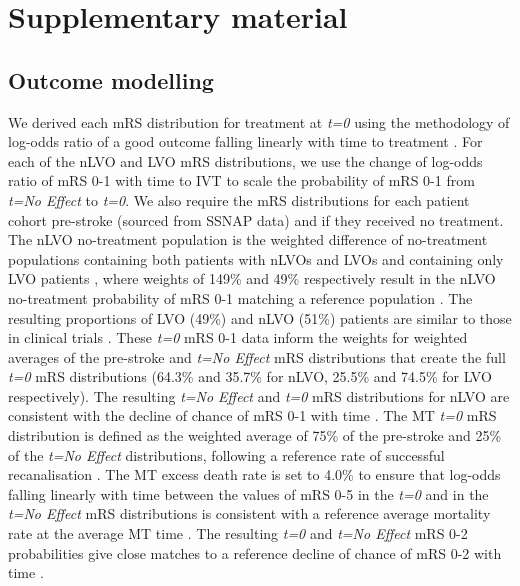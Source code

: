 \section{Supplementary material}

\subsection{Outcome modelling}

We derived each mRS distribution for treatment at \emph{t=0} using the methodology of log-odds ratio of a good outcome falling linearly with time to treatment \cite{emberson_effect_2014, fransen_time_2016}. For each of the nLVO and LVO mRS distributions, we use the change of log-odds ratio of mRS 0-1 with time to IVT \cite{emberson_effect_2014} to scale the probability of mRS 0-1 from \emph{t=No Effect} to \emph{t=0}. We also require the mRS distributions for each patient cohort pre-stroke (sourced from SSNAP data) and if they received no treatment. The nLVO no-treatment population is the weighted difference of no-treatment populations containing both patients with nLVOs and LVOs \cite{lees_time_2010} and containing only LVO patients \cite{goyal_endovascular_2016}, where weights of 149\% and 49\% respectively result in the nLVO no-treatment probability of mRS 0-1 matching a reference population \cite{emberson_effect_2014}. The resulting proportions of LVO (49\%) and nLVO (51\%) patients are similar to those in clinical trials \cite{ist-3_collaborative_group_benefits_2012, emberson_effect_2014}. 
These \emph{t=0} mRS 0-1 data inform the weights for weighted averages of the pre-stroke and \emph{t=No Effect} mRS distributions that create the full \emph{t=0} mRS distributions (64.3\% and 35.7\% for nLVO, 25.5\% and 74.5\% for LVO respectively). The resulting \emph{t=No Effect} and \emph{t=0} mRS distributions for nLVO are consistent with the decline of chance of mRS 0-1 with time \cite{holodinsky_modeling_2018}. The MT \emph{t=0} mRS distribution is defined as the weighted average of 75\% of the pre-stroke and 25\% of the \emph{t=No Effect} distributions, following a reference rate of successful recanalisation \cite{hui_efficacy_2020}. The MT excess death rate is set to 4.0\% to ensure that log-odds falling linearly with time between the values of mRS 0-5 in the \emph{t=0} and in the \emph{t=No Effect} mRS distributions is consistent with a reference average mortality rate at the average MT time \cite{goyal_endovascular_2016}. The resulting \emph{t=0} and \emph{t=No Effect} mRS 0-2 probabilities give close matches to a reference decline of chance of mRS 0-2 with time \cite{fransen_time_2016}.


